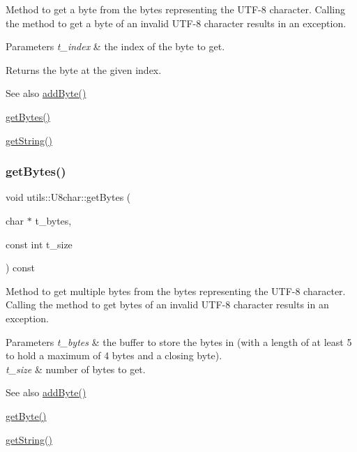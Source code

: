Method to get a byte from the bytes representing the U\+T\+F-\/8 character. Calling the method to get a byte of an invalid U\+T\+F-\/8 character results in an exception. 
\begin{DoxyParams}{Parameters}
{\em t\+\_\+index} & the index of the byte to get. \\
\hline
\end{DoxyParams}
\begin{DoxyReturn}{Returns}
the byte at the given index. 
\end{DoxyReturn}
\begin{DoxySeeAlso}{See also}
\hyperlink{classutils_1_1U8char_a749ac883897f455715be1083ed1c80dd}{add\+Byte()} 

\hyperlink{classutils_1_1U8char_a9bf39a597d04b56faac3325eebf49b39}{get\+Bytes()} 

\hyperlink{classutils_1_1U8char_a234c21cc7b616c9d5f249badf1ba33b2}{get\+String()} 
\end{DoxySeeAlso}
\mbox{\label{classutils_1_1U8char_a9bf39a597d04b56faac3325eebf49b39}} 
\subsubsection{\texorpdfstring{get\+Bytes()}{getBytes()}}
{\footnotesize\ttfamily void utils\+::\+U8char\+::get\+Bytes (\begin{DoxyParamCaption}\item[{char $\ast$}]{t\+\_\+bytes,  }\item[{const int}]{t\+\_\+size }\end{DoxyParamCaption}) const}

Method to get multiple bytes from the bytes representing the U\+T\+F-\/8 character. Calling the method to get bytes of an invalid U\+T\+F-\/8 character results in an exception. 
\begin{DoxyParams}{Parameters}
{\em t\+\_\+bytes} & the buffer to store the bytes in (with a length of at least 5 to hold a maximum of 4 bytes and a closing byte). \\
\hline
{\em t\+\_\+size} & number of bytes to get. \\
\hline
\end{DoxyParams}
\begin{DoxySeeAlso}{See also}
\hyperlink{classutils_1_1U8char_a749ac883897f455715be1083ed1c80dd}{add\+Byte()} 

\hyperlink{classutils_1_1U8char_af23db23219f81cfcc9424a7dbde981d9}{get\+Byte()} 

\hyperlink{classutils_1_1U8char_a234c21cc7b616c9d5f249badf1ba33b2}{get\+String()} 
\end{DoxySeeAlso}
\mbox{\label{classutils_1_1U8char_a234c21cc7b616c9d5f249badf1ba33b2}} 
